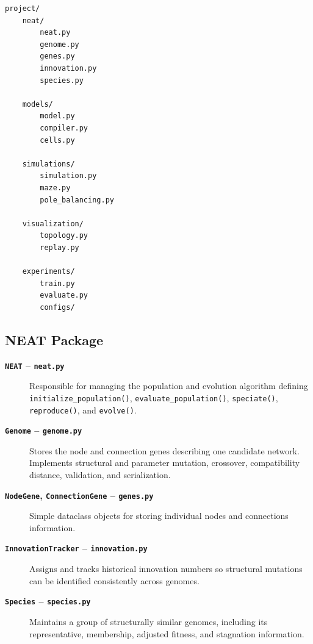 \documentclass[11pt]{article}
\begin{document}
\begin{verbatim}
project/
    neat/
        neat.py
        genome.py
        genes.py
        innovation.py
        species.py

    models/
        model.py
        compiler.py
        cells.py

    simulations/
        simulation.py
        maze.py
        pole_balancing.py

    visualization/
        topology.py
        replay.py

    experiments/
        train.py
        evaluate.py
        configs/
\end{verbatim}

\subsection{NEAT Package}

\begin{description}

    \item[\textbf{\texttt{NEAT} -- \texttt{neat.py}}]
    \hspace{1em} Responsible for managing the population and evolution algorithm defining
    \texttt{initialize\_population()},
    \texttt{evaluate\_population()},
    \texttt{speciate()},
    \texttt{reproduce()}, and
    \texttt{evolve()}.

    \item[\textbf{\texttt{Genome} -- \texttt{genome.py}}]
    \hspace{1em}Stores the node and connection genes describing one
    candidate network. Implements structural and parameter mutation,
    crossover, compatibility distance, validation, and serialization.

    \item[\textbf{\texttt{NodeGene}, \texttt{ConnectionGene} -- \texttt{genes.py}}]
    \hspace{1em}Simple dataclass objects for storing individual nodes and
    connections information.

    \item[\textbf{\texttt{InnovationTracker} -- \texttt{innovation.py}}]
    \hspace{1em}Assigns and tracks historical innovation numbers so
    structural mutations can be identified consistently across genomes.

    \item[\textbf{\texttt{Species} -- \texttt{species.py}}]
    \hspace{1em}Maintains a group of structurally similar genomes,
    including its representative, membership, adjusted fitness, and
    stagnation information.

\end{description}
\end{document}
